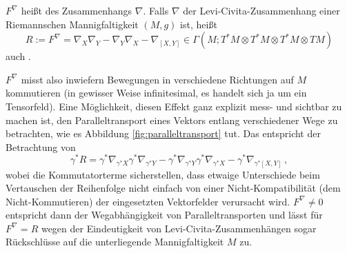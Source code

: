 \documentclass[../H_Analysis_main.tex]{subfiles}
\begin{document}
\begin{defi}
$F^\nabla$ heißt  des Zusammenhangs $\nabla$. Falls $\nabla$ der Levi-Civita-Zusammenhang einer Riemannschen Mannigfaltigkeit $(M, g)$ ist, heißt
\begin{equation}
R := F^\nabla = \nabla_X \nabla_Y - \nabla_Y \nabla_X - \nabla_{[X, Y]} \in \Gamma(M; T^* M \otimes T^* M \otimes T^* M \otimes TM)
\end{equation}
auch .
\end{defi}

$F^\nabla$ misst also inwiefern Bewegungen in verschiedene Richtungen auf $M$ kommutieren (in gewisser Weise infinitesimal, es handelt sich ja um ein Tensorfeld). Eine Möglichkeit, diesen Effekt ganz explizit mess- und sichtbar zu machen ist, den Paralleltransport eines Vektors entlang verschiedener Wege zu betrachten, wie es Abbildung \ref{fig:paralleltransport} tut. Das entspricht der Betrachtung von
\begin{equation*}
\gamma^* R = \gamma^* \nabla_{\gamma^* X} \gamma^* \nabla_{\gamma^* Y} - \gamma^* \nabla_{\gamma^* Y} \gamma^* \nabla_{\gamma^* X} - \gamma^* \nabla_{\gamma^* [X, Y]} \, ,
\end{equation*}
wobei die Kommutatorterme sicherstellen, dass etwaige Unterschiede beim Vertauschen der Reihenfolge nicht einfach von einer Nicht-Kompatibilität (dem Nicht-Kommutieren) der eingesetzten Vektorfelder verursacht wird. $F^\nabla \neq 0$ entspricht dann der Wegabhängigkeit von Paralleltransporten und lässt für $F^\nabla = R$ wegen der Eindeutigkeit von Levi-Civita-Zusammenhängen sogar Rückschlüsse auf die unterliegende Mannigfaltigkeit $M$ zu.




\end{document}
